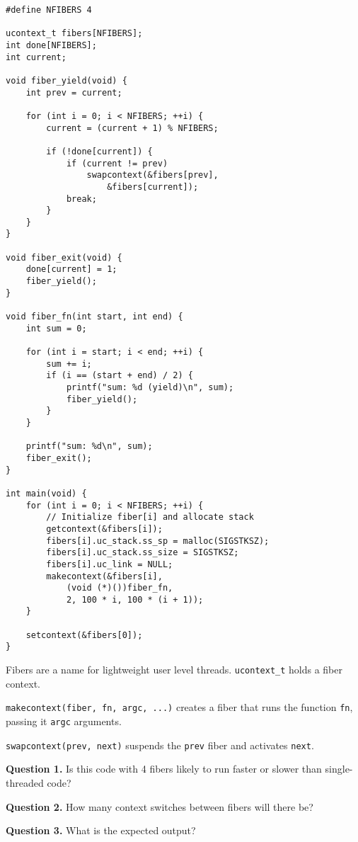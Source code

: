 \documentclass[letterpaper,twocolumn,10pt]{article}
\begin{document}
\begin{lstlisting}[style=CStyle]
#define NFIBERS 4

ucontext_t fibers[NFIBERS];
int done[NFIBERS];
int current;

void fiber_yield(void) {
    int prev = current;

    for (int i = 0; i < NFIBERS; ++i) {
        current = (current + 1) % NFIBERS;

        if (!done[current]) {
            if (current != prev)
                swapcontext(&fibers[prev],
                    &fibers[current]);
            break;
        }
    }
}

void fiber_exit(void) {
    done[current] = 1;
    fiber_yield();
}

void fiber_fn(int start, int end) {
    int sum = 0;

    for (int i = start; i < end; ++i) {
        sum += i;
        if (i == (start + end) / 2) {
            printf("sum: %d (yield)\n", sum);
            fiber_yield();
        }
    }

    printf("sum: %d\n", sum);
    fiber_exit();
}

int main(void) {
    for (int i = 0; i < NFIBERS; ++i) {
        // Initialize fiber[i] and allocate stack
        getcontext(&fibers[i]);
        fibers[i].uc_stack.ss_sp = malloc(SIGSTKSZ);
        fibers[i].uc_stack.ss_size = SIGSTKSZ;
        fibers[i].uc_link = NULL;
        makecontext(&fibers[i],
            (void (*)())fiber_fn,
            2, 100 * i, 100 * (i + 1));
    }

    setcontext(&fibers[0]);
}
\end{lstlisting}

\break

\noindent

Fibers are a name for lightweight user level threads.
\texttt{ucontext\_t} holds a fiber context.

\vspace{1em}

\texttt{makecontext(fiber, fn, argc, ...)} creates a fiber that runs the function \texttt{fn}, passing it \texttt{argc} arguments.

\vspace{1em}

\texttt{swapcontext(prev, next)} suspends the \texttt{prev} fiber and activates \texttt{next}.

\vspace{2em}

\textbf{Question 1.} Is this code with 4 fibers likely to run faster or slower than single-threaded code?

\vspace{12em}

\noindent
\textbf{Question 2.} How many context switches between fibers will there be?

\vspace{12em}
\noindent
\textbf{Question 3.} What is the expected output?

\vspace{12em}
\end{document}
